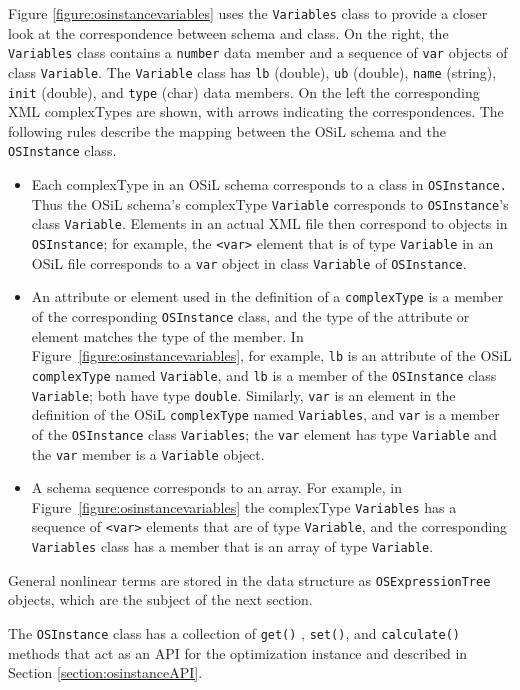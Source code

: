 \documentclass[11pt]{article}
\newcounter{Fig}
\renewcommand{\_}{{\char"5F}}
\renewcommand{\{}{{\char"7B}}
\renewcommand{\}}{{\char"7D}}
\renewcommand{\^}{{\char"0D}}
\renewcommand{\'}{{\char"0D}}
\newcommand{\Titem}{\item[$\triangleright$]}
\begin{document}
     Figure \ref{figure:osinstancevariables} uses the {\tt Variables} class to provide a closer look at the correspondence between schema and class. On the right, the {\tt Variables} class contains a {\tt number} data member and a sequence of {\tt var} objects of class {\tt Variable}. The {\tt Variable} class has {\tt lb} (double), {\tt ub} (double), {\tt name} (string), {\tt init} (double), and {\tt type} (char) data members. On the left the corresponding XML complexTypes are shown, with arrows indicating the correspondences. The following rules describe the mapping between the OSiL schema and the {\tt OSInstance} class.
%
\begin{itemize}

\Titem  Each complexType in an OSiL schema corresponds to a class in {\tt OSInstance.} Thus the OSiL schema's complexType {\tt Variable} corresponds to {\tt OSInstance}'s class {\tt Variable}.  Elements in an actual XML file then correspond to objects in {\tt OSInstance}; for example, the {\tt <var>} element that is of type {\tt Variable} in an OSiL file corresponds to a {\tt var} object in class {\tt Variable} of {\tt OSInstance}.

\Titem An attribute or element used in the definition of a {\tt complexType} is a member of the corresponding {\tt OSInstance} class, and the type of the attribute or element matches the type of the member.  In Figure~\ref{figure:osinstancevariables}, for example, {\tt lb} is an attribute of the OSiL {\tt complexType} named {\tt Variable}, and {\tt lb} is a member of the {\tt OSInstance} class {\tt Variable}; both have type {\tt double}.  Similarly, {\tt var} is an element in the definition of the OSiL {\tt complexType} named {\tt Variables}, and {\tt var} is a member of the {\tt OSInstance} class {\tt Variables}; the {\tt var} element has type {\tt Variable} and the {\tt var} member is a {\tt Variable} object.

\Titem A schema sequence corresponds to an array. For example, in Figure~\ref{figure:osinstancevariables} the complexType {\tt Variables} has a sequence of {\tt <var>} elements that are of type {\tt Variable}, and the corresponding {\tt Variables} class has a member that is an array of type {\tt Variable}.

\end{itemize}
%
General nonlinear terms are stored in the data structure as {\tt OSExpressionTree} objects, which are the subject of the next section.

     The {\tt OSInstance} class has a collection of {\tt get()} , {\tt set()}, and {\tt calculate()} methods that act as an API for the optimization instance and described in Section \ref{section:osinstanceAPI}.
\end{document}
